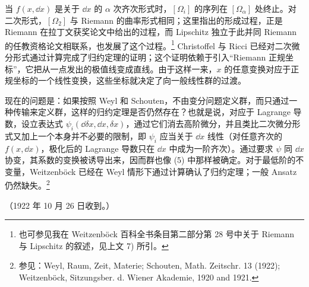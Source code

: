 当 $f(x,\dd x)$ 是关于 $\dd x$ 的 $\alpha$ 次齐次形式时，$[\Omega_i]$ 的序列在 $[\Omega_\alpha]$ 处终止。对二次形式，$[\Omega_2]$ 与 Riemann 的曲率形式相同；这里指出的形成过程，正是 Riemann 在拉丁文获奖论文中给出的过程，而 Lipschitz 独立于此并同 Riemann 的任教资格论文相联系，也发展了这个过程。\footnote{也可参见我在 Weitzenböck 百科全书条目第二部分第 28 号中关于 Riemann 与 Lipschitz 的叙述，见上文 7) 所引。} Christoffel 与 Ricci 已经对二次微分形式通过计算完成了归约定理的证明；这个证明依赖于引入“Riemann 正规坐标”，它把从一点发出的极值线变成直线。由于这样一来，$x$ 的任意变换对应于正规坐标的一个线性变换，这些坐标就决定了向一般线性群的过渡。

现在的问题是：如果按照 Weyl 和 Schouten，不由变分问题定义群，而只通过一种传输来定义群，这样的归约定理是否仍然存在？也就是说，对应于 Lagrange 导数，设立表达式 $\psi_i(\dd\delta x,\dd x,\delta x)$，通过它们消去高阶微分，并且类比二次微分形式又加上一个本身并不必要的限制，即 $\psi_i$ 应当关于 $\dd x$ 线性（对任意齐次的 $f(x,\dd x)$，极化后的 Lagrange 导数只在 $\dd x$ 中成为一阶齐次）。通过要求 $\psi$ 同 $\dd x$ 协变，其系数的变换被诱导出来，因而群也像 (5) 中那样被确定。对于最低阶的不变量，Weitzenböck 已经在 Weyl 情形下通过计算确认了归约定理；一般 Ansatz 仍然缺失。\footnote{参见：Weyl, Raum, Zeit, Materie; Schouten, Math. Zeitschr. 13 (1922); Weitzenböck, Sitzungsber. d. Wiener Akademie, 1920 and 1921.}

\begin{center}
（1922 年 10 月 26 日收到。）
\end{center}

\clearpage


\setcounter{footnote}{0}
